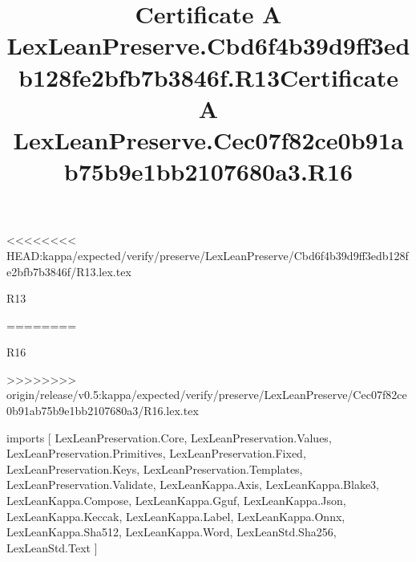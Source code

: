 <<<<<<<< HEAD:kappa/expected/verify/preserve/LexLeanPreserve/Cbd6f4b39d9ff3edb128fe2bfb7b3846f/R13.lex.tex
\begin{lexlean}{R13}
\title{Certificate A LexLeanPreserve.Cbd6f4b39d9ff3edb128fe2bfb7b3846f.R13}
========
\begin{lexlean}{R16}
\title{Certificate A LexLeanPreserve.Cec07f82ce0b91ab75b9e1bb2107680a3.R16}
>>>>>>>> origin/release/v0.5:kappa/expected/verify/preserve/LexLeanPreserve/Cec07f82ce0b91ab75b9e1bb2107680a3/R16.lex.tex
\begin{coremodule}
imports [
  LexLeanPreservation.Core,
  LexLeanPreservation.Values,
  LexLeanPreservation.Primitives,
  LexLeanPreservation.Fixed,
  LexLeanPreservation.Keys,
  LexLeanPreservation.Templates,
  LexLeanPreservation.Validate,
  LexLeanKappa.Axis,
  LexLeanKappa.Blake3,
  LexLeanKappa.Compose,
  LexLeanKappa.Gguf,
  LexLeanKappa.Json,
  LexLeanKappa.Keccak,
  LexLeanKappa.Label,
  LexLeanKappa.Onnx,
  LexLeanKappa.Sha512,
  LexLeanKappa.Word,
  LexLeanStd.Sha256,
  LexLeanStd.Text
]


\end{coremodule}
\end{lexlean}
\end{lexlean}

